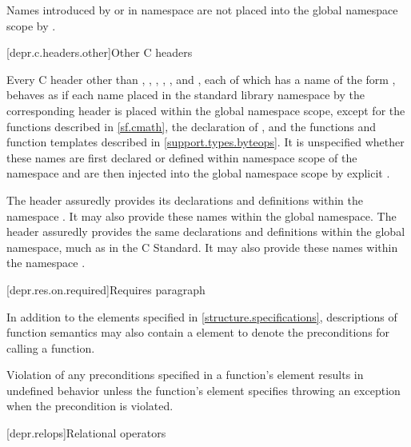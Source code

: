 \pnum
\begin{note}
Names introduced by  or 
in namespace 
are not placed into the global namespace scope by .
\end{note}

[depr.c.headers.other]{Other C headers}

\pnum
Every C header
other than
,
,
,\newline
{},
, and
,
each of
which has a name of the form
%
,
behaves as if each name placed in the standard library namespace by
the corresponding
header is placed within
the global namespace scope,
except for the functions described in \ref{sf.cmath},
the declaration of , and
the functions and function templates described in \ref{support.types.byteops}.
It is unspecified whether these names are first declared or defined within
namespace scope of the namespace
 and are then injected into the global namespace scope by
explicit .

\pnum
\begin{example}
The header  assuredly
provides its declarations and definitions within the namespace
. It may also provide these names within the
global namespace.
The header 
assuredly provides the same declarations and definitions within
the global namespace,
much as in the C Standard. It may also provide these names within
the namespace .
\end{example}

[depr.res.on.required]{Requires paragraph}

\pnum
In addition to the elements specified in \ref{structure.specifications},
descriptions of function semantics may also contain a \requires element
to denote the preconditions for calling a function.

\pnum
{}%
Violation of any preconditions specified in a function's \requires element
results in undefined behavior
unless the function's \throws element
specifies throwing an exception when the precondition is violated.

[depr.relops]{Relational operators}%
%

